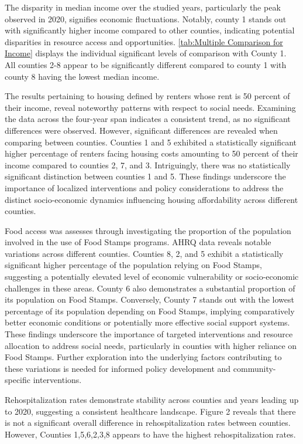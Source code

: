 \documentclass[12pt]{article}
\begin{document}
The disparity in median income over the studied years, particularly the peak observed in 2020, 
signifies economic fluctuations. Notably, county 1 stands out with significantly higher income 
compared to other counties, indicating potential disparities in resource access and opportunities. 
\ref{tab:Multiple Comparison for Income}
 displays the individual significant levels of comparison with County 1.
All counties 2-8 appear to be significantly different compared to county 1 with county 8 having the lowest median income.

The results pertaining to housing defined by renters whose rent is 50 percent of their income, 
reveal noteworthy patterns with respect to social needs. Examining the data across the four-year span 
indicates a consistent trend, as no significant differences were observed. However, significant differences are 
revealed when comparing between counties. Counties 1 and 5 exhibited a statistically significant higher
 percentage of renters facing housing costs amounting to 50 percent of their income compared to 
counties 2, 7, and 3. Intriguingly, there was no statistically significant distinction between counties 
1 and 5. These 
findings underscore the importance of localized interventions and policy considerations to address the 
distinct socio-economic dynamics influencing housing affordability across different counties.

Food access was assesses through investigating the proportion of the population involved in the use of Food Stamps programs.
AHRQ data reveals notable variations across different counties. Counties 8, 2, and 5 exhibit a statistically significant 
higher percentage of the population relying on Food Stamps, suggesting a potentially elevated level of economic 
vulnerability or socio-economic challenges in these areas. County 6 also demonstrates a substantial proportion 
of its population on Food Stamps. Conversely, County 7 stands 
out with the lowest percentage of its population depending on Food Stamps, implying comparatively better 
economic conditions or potentially more effective social support systems. These findings underscore the 
importance of targeted interventions and resource allocation to address social needs, particularly in counties 
with higher reliance on Food Stamps. Further exploration into the underlying factors contributing to these variations 
is needed for informed policy development and community-specific interventions.

Rehospitalization rates demonstrate stability across counties and years leading up to 2020, suggesting 
a consistent healthcare landscape. Figure 2 reveals that there is not a significant overall difference in rehospitalization rates between
counties. However, Counties 1,5,6,2,3,8 appears to have the highest rehospitalization rates.
\end{document}
